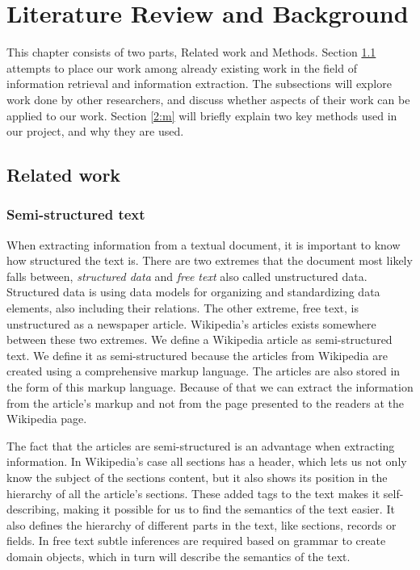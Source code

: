 
\chapter{Literature Review and Background} \label{cap_2}

This chapter consists of two parts, Related work and Methods. Section \ref{2:rw} attempts to place our work among already existing work in the field of information retrieval and information extraction. The subsections will explore work done by other researchers, and discuss whether aspects of their work can be applied to our work. Section \ref{2:m} will briefly explain two key methods used in our project, and why they are used.


\section{Related work} \label{2:rw}

\subsection{Semi-structured text}
When extracting information from a textual document, it is important to know how structured the text is. There are two extremes that the document most likely falls between, \textit{structured data} and \textit{free text}  \cite{semi-struc-text} also called unstructured data. Structured data is using data models for organizing and standardizing data elements, also including their relations. The other extreme, free text, is unstructured as a newspaper article. Wikipedia's articles exists somewhere between these two extremes. We define a Wikipedia article as semi-structured text. We define it as semi-structured because the articles from Wikipedia are created using a comprehensive markup language. The articles are also stored in the form of this markup language. Because of that we can extract the information from the article's markup and not from the page presented to the readers at the Wikipedia page. 

The fact that the articles are semi-structured is an advantage when extracting information. In Wikipedia's case all sections has a header, which lets us not only know the subject of the sections content, but it also shows its position in the hierarchy of all the article's sections. These added tags to the text makes it self-describing, making it possible for us to find the semantics of the text easier. It also defines the hierarchy of different parts in the text, like sections, records or fields. In free text subtle inferences are required based on grammar to create domain objects, which in turn will describe the semantics of the text. 

